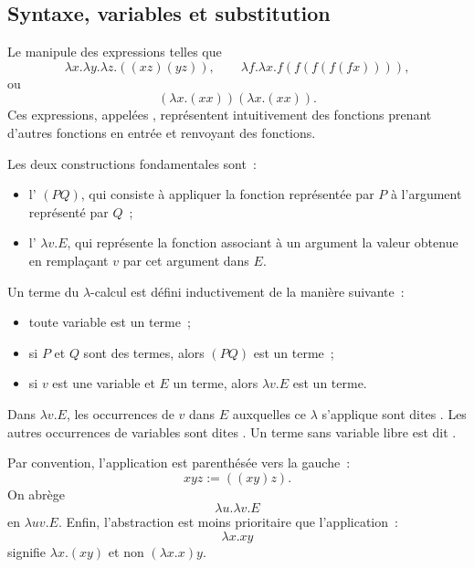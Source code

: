 \subsection{Syntaxe, variables et substitution}

\thingy Le 
manipule des expressions telles que
\[
\lambda x.\lambda y.\lambda z.((xz)(yz)),
\qquad
\lambda f.\lambda x.f(f(f(f(fx)))),
\]
ou
\[
(\lambda x.(xx))(\lambda x.(xx)).
\]
Ces expressions, appelées ,
représentent intuitivement des fonctions prenant d'autres fonctions en
entrée et renvoyant des fonctions.

Les deux constructions fondamentales sont :
\begin{itemize}
\item l' $(PQ)$,
  qui consiste à appliquer la fonction représentée par $P$ à
  l'argument représenté par $Q$ ;
\item l'
  $\lambda v.E$, qui représente la fonction associant à un argument
  la valeur obtenue en remplaçant $v$ par cet argument dans $E$.
\end{itemize}

\begin{defn}\label{definition-lambda-terms}
Un terme du $\lambda$-calcul est défini inductivement de la manière
suivante :
\begin{itemize}
\item toute variable est un terme ;
\item si $P$ et $Q$ sont des termes, alors $(PQ)$ est un terme ;
\item si $v$ est une variable et $E$ un terme, alors $\lambda v.E$ est
  un terme.
\end{itemize}
Dans $\lambda v.E$, les occurrences de $v$ dans $E$ auxquelles ce
$\lambda$ s'applique sont dites .  Les autres occurrences de variables sont dites
.  Un terme sans variable libre est dit
.
\end{defn}

Par convention, l'application est parenthésée vers la gauche :
\[
xyz:=((xy)z).
\]
On abrège
\[
\lambda u.\lambda v.E
\]
en $\lambda uv.E$.  Enfin, l'abstraction est moins prioritaire que
l'application :
\[
\lambda x.xy
\]
signifie $\lambda x.(xy)$ et non $(\lambda x.x)y$.

